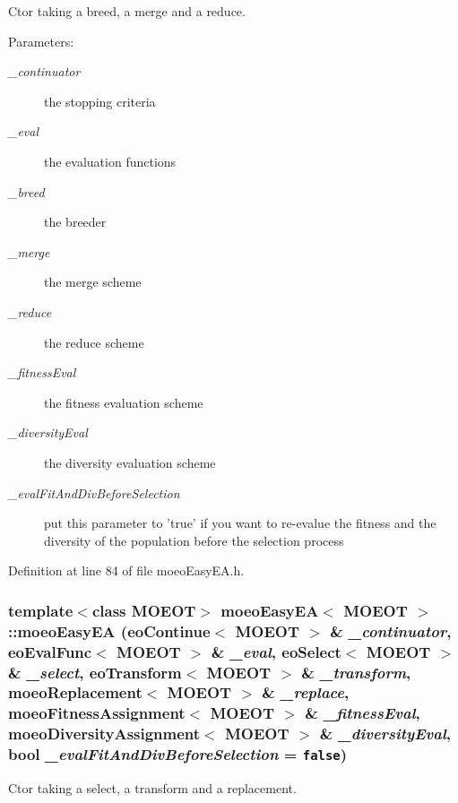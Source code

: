 Ctor taking a breed, a merge and a reduce. 

\begin{Desc}
\item[Parameters:]
\begin{description}
\item[{\em \_\-continuator}]the stopping criteria \item[{\em \_\-eval}]the evaluation functions \item[{\em \_\-breed}]the breeder \item[{\em \_\-merge}]the merge scheme \item[{\em \_\-reduce}]the reduce scheme \item[{\em \_\-fitness\-Eval}]the fitness evaluation scheme \item[{\em \_\-diversity\-Eval}]the diversity evaluation scheme \item[{\em \_\-eval\-Fit\-And\-Div\-Before\-Selection}]put this parameter to 'true' if you want to re-evalue the fitness and the diversity of the population before the selection process \end{description}
\end{Desc}


Definition at line 84 of file moeo\-Easy\-EA.h.
\subsubsection{\setlength{\rightskip}{0pt plus 5cm}template$<$class MOEOT$>$ \bf{moeo\-Easy\-EA}$<$ MOEOT $>$::\bf{moeo\-Easy\-EA} (\bf{eo\-Continue}$<$ MOEOT $>$ \& {\em \_\-continuator}, \bf{eo\-Eval\-Func}$<$ MOEOT $>$ \& {\em \_\-eval}, \bf{eo\-Select}$<$ MOEOT $>$ \& {\em \_\-select}, \bf{eo\-Transform}$<$ MOEOT $>$ \& {\em \_\-transform}, \bf{moeo\-Replacement}$<$ MOEOT $>$ \& {\em \_\-replace}, \bf{moeo\-Fitness\-Assignment}$<$ MOEOT $>$ \& {\em \_\-fitness\-Eval}, \bf{moeo\-Diversity\-Assignment}$<$ MOEOT $>$ \& {\em \_\-diversity\-Eval}, bool {\em \_\-eval\-Fit\-And\-Div\-Before\-Selection} = {\tt false})\hspace{0.3cm}{\tt  [inline]}}\label{classmoeoEasyEA_27f0db7a608636c904305afa11cd6ae1}


Ctor taking a select, a transform and a replacement. 

